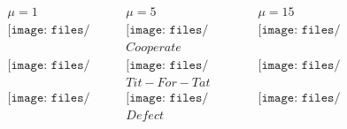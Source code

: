 \documentclass[11pt]{article} %
\begin{document}




\begin{figure}[h]
	\begin{center}$
		\begin{array}{ccc}
			{\mu = 1}&{\mu = 5}&{\mu = 15}\\
			\texttt{[image: files/figures/tern\_c\_1]}&
			\texttt{[image: files/figures/tern\_c\_5]}&
			\texttt{[image: files/figures/tern\_c\_15]}\\
			&Cooperate&\\
			\texttt{[image: files/figures/tern\_tft\_1]}&
			\texttt{[image: files/figures/tern\_tft\_5]}&
			\texttt{[image: files/figures/tern\_tft\_15]}\\
			&Tit-For-Tat&\\
			\texttt{[image: files/figures/tern\_d\_1]}&
			\texttt{[image: files/figures/tern\_d\_5]}&
			\texttt{[image: files/figures/tern\_d\_15]}\\
			&Defect&
			
		\end{array}$
	\end{center}
\end{figure}


\end{document}
